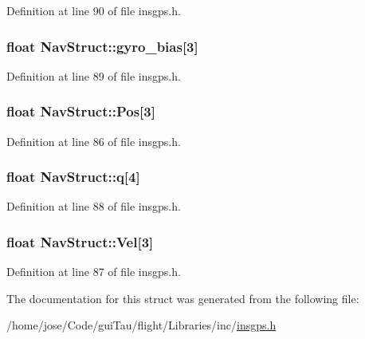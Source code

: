 Definition at line 90 of file insgps.\-h.

\hypertarget{struct_nav_struct_a9c9000672764dadcd54b2aec7ba67d15}{
\subsubsection[{gyro\-\_\-bias}]{\setlength{\rightskip}{0pt plus 5cm}float Nav\-Struct\-::gyro\-\_\-bias\mbox{[}3\mbox{]}}}\label{struct_nav_struct_a9c9000672764dadcd54b2aec7ba67d15}


Definition at line 89 of file insgps.\-h.

\hypertarget{struct_nav_struct_aedabeb0b4afabbf684e440bb5f3befee}{
\subsubsection[{Pos}]{\setlength{\rightskip}{0pt plus 5cm}float Nav\-Struct\-::\-Pos\mbox{[}3\mbox{]}}}\label{struct_nav_struct_aedabeb0b4afabbf684e440bb5f3befee}


Definition at line 86 of file insgps.\-h.

\hypertarget{struct_nav_struct_a43b4e16c71db697af873a35b8f577aab}{
\subsubsection[{q}]{\setlength{\rightskip}{0pt plus 5cm}float Nav\-Struct\-::q\mbox{[}4\mbox{]}}}\label{struct_nav_struct_a43b4e16c71db697af873a35b8f577aab}


Definition at line 88 of file insgps.\-h.

\hypertarget{struct_nav_struct_a0bb53e4e617d7bae88f060151d1951d3}{
\subsubsection[{Vel}]{\setlength{\rightskip}{0pt plus 5cm}float Nav\-Struct\-::\-Vel\mbox{[}3\mbox{]}}}\label{struct_nav_struct_a0bb53e4e617d7bae88f060151d1951d3}


Definition at line 87 of file insgps.\-h.



The documentation for this struct was generated from the following file\-:\begin{DoxyCompactItemize}
\item 
/home/jose/\-Code/gui\-Tau/flight/\-Libraries/inc/\hyperlink{insgps_8h}{insgps.\-h}\end{DoxyCompactItemize}
